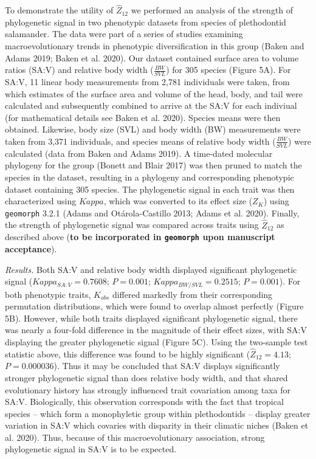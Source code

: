 \documentclass[
]{article}
\begin{document}
To demonstrate the utility of \(\hat{Z}_{12}\) we performed an analysis
of the strength of phylogenetic signal in two phenotypic datasets from
species of plethodontid salamander. The data were part of a series of
studies examining macroevolutionary trends in phenotypic diversification
in this group (Baken and Adams 2019; Baken et al. 2020). Our dataset
contained surface area to volume ratios (SA:V) and relative body width
(\(\frac{BW}{SVL}\)) for 305 species (Figure 5A). For SA:V, 11 linear
body measurements from 2,781 individuals were taken, from which
estimates of the surface area and volume of the head, body, and tail
were calculated and subsequently combined to arrive at the SA:V for each
indiviual (for mathematical details see Baken et al. 2020). Species
means were then obtained. Likewise, body size (SVL) and body width (BW)
measurements were taken from 3,371 individuals, and species means of
relative body width (\(\frac{BW}{SVL}\)) were calculated (data from
Baken and Adams 2019). A time-dated molecular phylogeny for the group
(Bonett and Blair 2017) was then pruned to match the species in the
dataset, resulting in a phylogeny and corresponding phenotypic dataset
containing 305 species. The phylogenetic signal in each trait was then
characterized using \(Kappa\), which was converted to its effect size
(\(Z_K\)) using \texttt{geomorph} 3.2.1 (Adams and Otárola-Castillo
2013; Adams et al. 2020). Finally, the strength of phylogenetic signal
was compared across traits using \(\hat{Z}_{12}\) as described above
(\textbf{to be incorporated in \texttt{geomorph} upon manuscript
acceptance}). \hfill\break

\emph{Results.} Both SA:V and relative body width displayed significant
phylogenetic signal (\(Kappa_{SA:V}=0.7608\); \(P=0.001\);
\(Kappa_{BW/SVL}=0.2515\); \(P=0.001\)). For both phenotypic traits,
\(K_{obs}\) differed markedly from their corresponding permutation
distributions, which were found to overlap almost perfectly (Figure 5B).
However, while both traits displayed significant phylogenetic signal,
there was nearly a four-fold difference in the magnitude of their effect
sizes, with SA:V displaying the greater phylogenetic signal (Figure 5C).
Using the two-sample test statistic above, this difference was found to
be highly significant (\(\hat{Z}_{12}=4.13\); \(P=0.000036\)). Thus it
may be concluded that SA:V displays significantly stronger phylogenetic
signal than does relative body width, and that shared evolutionary
history has strongly influenced trait covariation among taxa for SA:V.
Biologically, this observation corresponds with the fact that tropical
species -- which form a monophyletic group within plethodontids --
display greater variation in SA:V which covaries with disparity in their
climatic niches (Baken et al. 2020). Thus, because of this
macroevolutionary association, strong phylogenetic signal in SA:V is to
be expected.
\end{document}
